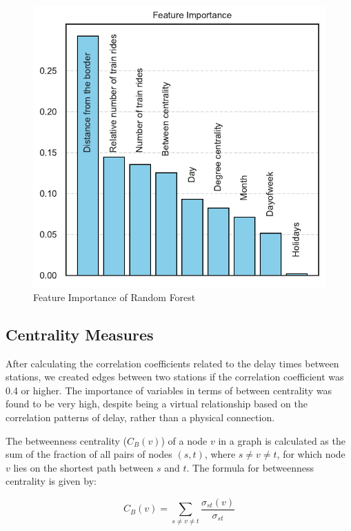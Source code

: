 \documentclass{article}
\theoremstyle{plain}
\theoremstyle{definition}
\theoremstyle{remark}
\begin{document}
\begin{figure}
    \centering
    \includegraphics[width=1\linewidth]{fig/plot_JH_feature_importance.pdf}
    \caption{Feature Importance of Random Forest}
    \label{fig:enter-label}
\end{figure}

\subsection{{Centrality Measures}}

After calculating the correlation coefficients related to the delay times between stations, we created edges between two stations if the correlation coefficient was 0.4 or higher. The importance of variables in terms of between centrality was found to be very high, despite being a virtual relationship based on the correlation patterns of delay, rather than a physical connection.


The betweenness centrality ($C_B(v)$) of a node $v$ in a graph is calculated as the sum of the fraction of all pairs of nodes $(s, t)$, where $s \neq v \neq t$, for which node $v$ lies on the shortest path between $s$ and $t$. The formula for betweenness centrality is given by:

\begin{equation}
C_B(v) = \sum_{s \neq v \neq t} \frac{\sigma_{st}(v)}{\sigma_{st}}
\end{equation}
\end{document}

